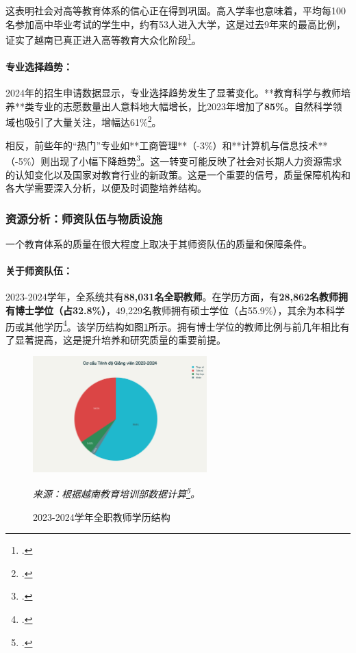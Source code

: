 这表明社会对高等教育体系的信心正在得到巩固。高入学率也意味着，平均每100名参加高中毕业考试的学生中，约有53人进入大学，这是过去9年来的最高比例，证实了越南已真正进入高等教育大众化阶段\footcite{stat_ty_le_vao_dh_2023}。

\paragraph{专业选择趋势：}
2024年的招生申请数据显示，专业选择趋势发生了显著变化。**教育科学与教师培养**类专业的志愿数量出人意料地大幅增长，比2023年增加了\textbf{85\%}。自然科学领域也吸引了大量关注，增幅达61\%\footcite{stat_tuyen_sinh_2024_so_lieu}。

相反，前些年的“热门”专业如**工商管理**（-3\%）和**计算机与信息技术**（-5\%）则出现了小幅下降趋势\footcite{stat_tuyen_sinh_2024_so_lieu}。这一转变可能反映了社会对长期人力资源需求的认知变化以及国家对教育行业的新政策。这是一个重要的信号，质量保障机构和各大学需要深入分析，以便及时调整培养结构。

\subsubsection{资源分析：师资队伍与物质设施}

一个教育体系的质量在很大程度上取决于其师资队伍的质量和保障条件。

\paragraph{关于师资队伍：}
2023-2024学年，全系统共有\textbf{88,031名全职教师}。在学历方面，有\textbf{28,862名教师拥有博士学位（占32.8\%）}，49,229名教师拥有硕士学位（占55.9\%），其余为本科学历或其他学历\footcite{stat_moet_2024}。该学历结构如图\ref{fig:co_cau_giang_vien}所示。拥有博士学位的教师比例与前几年相比有了显著提高，这是提升培养和研究质量的重要前提。


\begin{figure}[h!]
    \centering
    \includegraphics[width=0.6\textwidth]{image/co_cau_trinh_do_giang_vien_2023_2024.png}
    \caption{2023-2024学年全职教师学历结构}
    \label{fig:co_cau_giang_vien}
    \vspace{0.2cm}
    \footnotesize{\textit{来源：根据越南教育培训部数据计算\footcite{stat_moet_2024}。}}
\end{figure}

